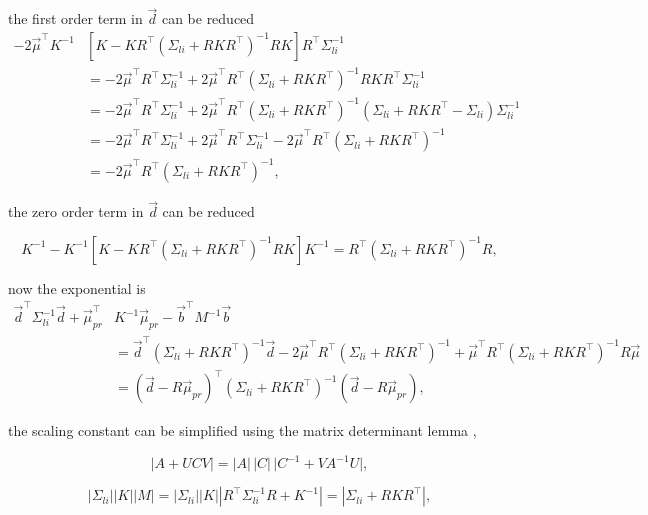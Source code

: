 \noindent the first order term in $\vec d$ can be reduced
$$
\begin{aligned}
-2 \vec{\mu}^{\top} K^{-1} &\left[K - K R^{\top} \left(\Sigma_{li} + RK R^{\top}\right)^{-1} R K \right] R^{\top} \Sigma_{li}^{-1} \\
&= -2 \vec{\mu}^{\top} R^{\top} \Sigma_{li}^{-1} + 2 \vec{\mu}^{\top} R^{\top} \left(\Sigma_{li} + RK R^{\top}\right)^{-1} R K R^{\top} \Sigma_{li}^{-1}\\
&= -2 \vec{\mu}^{\top} R^{\top} \Sigma_{li}^{-1} + 2 \vec{\mu}^{\top} R^{\top} \left(\Sigma_{li} + RK R^{\top}\right)^{-1} \left( \Sigma_{li} + R K R^{\top} - \Sigma_{li} \right) \Sigma_{li}^{-1} \\
&= -2 \vec{\mu}^{\top} R^{\top} \Sigma_{li}^{-1} + 2 \vec{\mu}^{\top} R^{\top} \Sigma_{li}^{-1} - 2 \vec{\mu}^{\top} R^{\top} \left(\Sigma_{li} + RK R^{\top}\right)^{-1} \\
&= -2 \vec{\mu}^{\top} R^{\top} \left(\Sigma_{li} + RK R^{\top}\right)^{-1},
\end{aligned}
$$

\noindent the zero order term in $\vec d$ can be reduced 

$$
K^{-1} - K^{-1}\left[K - K R^{\top} \left(\Sigma_{li} + RK R^{\top}\right)^{-1} R K \right] K^{-1} = R^{\top} \left(\Sigma_{li} + RK R^{\top}\right)^{-1} R,
$$

\noindent now the exponential is 
$$
\begin{aligned}
\vec d ^\top \Sigma_{li}^{-1} \vec d + \vec \mu_{pr}^\top &K^{-1} \vec \mu_{pr} - \vec b^\top M^{-1}\vec b \\
&= \vec{d}^{\top} \left(\Sigma_{li} + RK R^{\top}\right)^{-1} \vec{d} -2 \vec{\mu}^{\top} R^{\top} \left(\Sigma_{li} + RK R^{\top}\right)^{-1} + \vec{\mu}^{\top} R^{\top} \left(\Sigma_{li} + RK R^{\top}\right)^{-1} R \vec{\mu} \\
&= (\vec{d} - R\vec{\mu}_{pr})^{\top} (\Sigma_{li} + R K R^{\top})^{-1} (\vec{d} - R\vec{\mu}_{pr}),
\end{aligned}
$$

\noindent the scaling constant can be simplified using the matrix determinant lemma \cite{gp4ml}, 

\begin{equation}
\lvert A + UCV \rvert = \lvert A \rvert \, \lvert C \rvert \, \lvert C^{-1} + V A^{-1} U \rvert,
\end{equation}

$$
|\Sigma_{li}||K||M| = |\Sigma_{li}||K||R^\top \Sigma_{li}^{-1} R + K^{-1}| = |\Sigma_{li} + RKR^\top|,
$$

